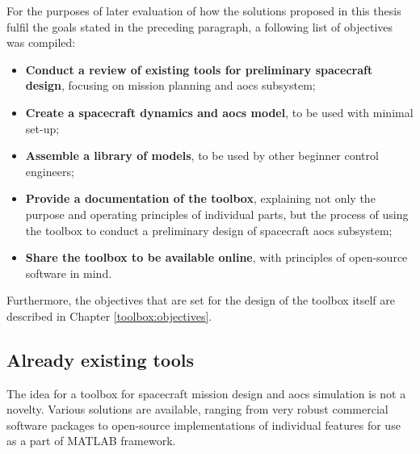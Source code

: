     For the purposes of later evaluation of how the solutions proposed in this thesis fulfil the goals stated in the preceding paragraph, a following list of objectives was compiled:

    \begin{itemize}
        \item \textbf{Conduct a review of existing tools for preliminary spacecraft design}, focusing on mission planning and \ac{aocs} subsystem;
        \item \textbf{Create a spacecraft dynamics and \ac{aocs} model}, to be used with minimal set-up;
        \item \textbf{Assemble a library of models}, to be used by other beginner control engineers;
        \item \textbf{Provide a documentation of the toolbox}, explaining not only the purpose and operating principles of individual parts, but the process of using the toolbox to conduct a preliminary design of spacecraft \ac{aocs} subsystem;
        \item \textbf{Share the toolbox to be available online}, with principles of open-source software in mind.
    \end{itemize}

    Furthermore, the objectives that are set for the design of the toolbox itself are described in Chapter \ref{toolbox:objectives}.


\subsection{Already existing tools}\label{sec:review}

    The idea for a toolbox for spacecraft mission design and \ac{aocs} simulation is not a novelty. Various solutions are available, ranging from very robust commercial software packages to open-source implementations of individual features for use as a part of MATLAB framework.

